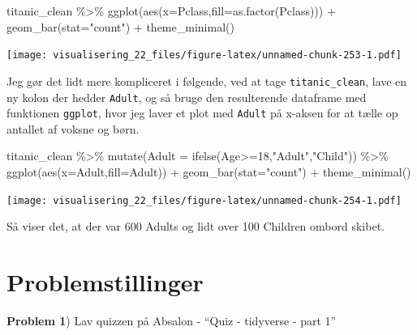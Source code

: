 \documentclass[
]{book}
\newenvironment{Shaded}{\begin{snugshade}}{\end{snugshade}}
\newcommand{\AttributeTok}[1]{\textcolor[rgb]{0.77,0.63,0.00}{#1}}
\newcommand{\DecValTok}[1]{\textcolor[rgb]{0.00,0.00,0.81}{#1}}
\newcommand{\FunctionTok}[1]{\textcolor[rgb]{0.00,0.00,0.00}{#1}}
\newcommand{\NormalTok}[1]{#1}
\newcommand{\SpecialCharTok}[1]{\textcolor[rgb]{0.00,0.00,0.00}{#1}}
\newcommand{\StringTok}[1]{\textcolor[rgb]{0.31,0.60,0.02}{#1}}
\begin{document}
\begin{Shaded}
\begin{Highlighting}[]
\NormalTok{titanic\_clean }\SpecialCharTok{\%\textgreater{}\%} 
  \FunctionTok{ggplot}\NormalTok{(}\FunctionTok{aes}\NormalTok{(}\AttributeTok{x=}\NormalTok{Pclass,}\AttributeTok{fill=}\FunctionTok{as.factor}\NormalTok{(Pclass))) }\SpecialCharTok{+} 
  \FunctionTok{geom\_bar}\NormalTok{(}\AttributeTok{stat=}\StringTok{"count"}\NormalTok{) }\SpecialCharTok{+}
  \FunctionTok{theme\_minimal}\NormalTok{()}
\end{Highlighting}
\end{Shaded}

\texttt{[image: visualisering\_22\_files/figure-latex/unnamed-chunk-253-1.pdf]}

Jeg gør det lidt mere kompliceret i følgende, ved at tage \texttt{titanic\_clean}, lave en ny kolon der hedder \texttt{Adult}, og så bruge den resulterende dataframe med funktionen \texttt{ggplot}, hvor jeg laver et plot med \texttt{Adult} på x-aksen for at tælle op antallet af voksne og børn.

\begin{Shaded}
\begin{Highlighting}[]
\NormalTok{titanic\_clean }\SpecialCharTok{\%\textgreater{}\%} 
   \FunctionTok{mutate}\NormalTok{(}\AttributeTok{Adult =} \FunctionTok{ifelse}\NormalTok{(Age}\SpecialCharTok{\textgreater{}=}\DecValTok{18}\NormalTok{,}\StringTok{"Adult"}\NormalTok{,}\StringTok{"Child"}\NormalTok{)) }\SpecialCharTok{\%\textgreater{}\%} 
   \FunctionTok{ggplot}\NormalTok{(}\FunctionTok{aes}\NormalTok{(}\AttributeTok{x=}\NormalTok{Adult,}\AttributeTok{fill=}\NormalTok{Adult)) }\SpecialCharTok{+} 
   \FunctionTok{geom\_bar}\NormalTok{(}\AttributeTok{stat=}\StringTok{"count"}\NormalTok{) }\SpecialCharTok{+} 
   \FunctionTok{theme\_minimal}\NormalTok{()}
\end{Highlighting}
\end{Shaded}

\texttt{[image: visualisering\_22\_files/figure-latex/unnamed-chunk-254-1.pdf]}

Så viser det, at der var 600 Adults og lidt over 100 Children ombord skibet.

\hypertarget{problemstillinger-4}{%
\section{Problemstillinger}\label{problemstillinger-4}}

\textbf{Problem 1}) Lav quizzen på Absalon - ``Quiz - tidyverse - part 1''
\end{document}
